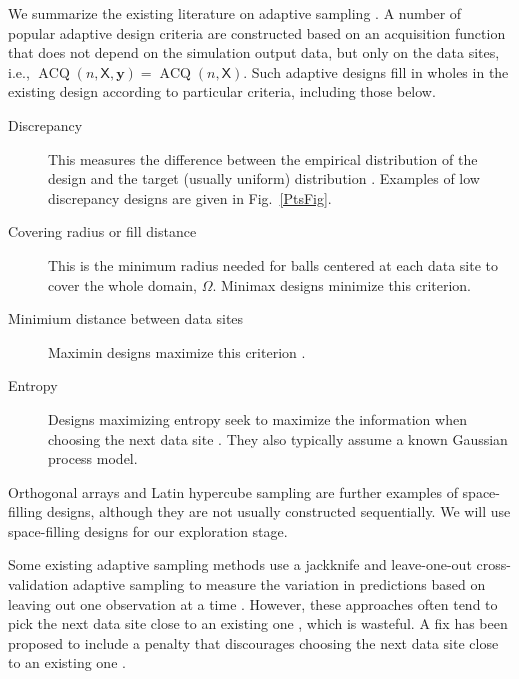 \documentclass[11pt]{NSFamsart}
\DeclareMathOperator{\VAL}{ACQ}
\newcommand{\mX}{\mathsf{X}}
\newcommand{\by}{{\boldsymbol{y}}}
\begin{document}
We summarize the existing literature on adaptive sampling \cite{aute2013cross,burnaev2015adaptive,fu2017adaptive,gramacy2008adaptive,jin2002sequential,kleijnen2004application}. A number of popular adaptive design criteria are constructed based on an acquisition function that does not depend on the simulation output data, but only on the data sites, i.e., $\VAL(n,\mX,\by) = \VAL(n,\mX)$. Such adaptive designs fill in wholes in the existing design according to particular criteria, including those below. 
\begin{description}
\item[Discrepancy] This measures the difference between the empirical distribution of the design and the target (usually uniform) distribution \cite{FangEtal19a}. Examples of low discrepancy designs are given in Fig.\ \ref{PtsFig}. 
\item[Covering radius or fill distance] This is the minimum radius needed for balls centered at each data site to cover the whole domain, $\Omega$. Minimax designs minimize this criterion.
\item[Minimium distance between data sites] Maximin designs maximize this criterion \cite{jin2002sequential}.
\item[Entropy] Designs maximizing entropy seek to maximize the information when choosing the next data site \cite{jin2002sequential}. They also typically assume a known Gaussian process model.
\end{description}
Orthogonal arrays and Latin hypercube sampling are further examples of space-filling designs, although they are not usually constructed sequentially. We will use space-filling designs for our exploration stage. 

Some existing adaptive sampling methods use a jackknife and leave-one-out cross-validation adaptive sampling to measure the variation in predictions based on leaving out one observation at a time \cite{aute2013cross,jin2002sequential, kleijnen2004application}. However, these approaches often tend to pick the next data site close to an existing one \cite{jin2002sequential}, which is wasteful. A fix has been proposed to include a penalty that discourages choosing the next data site close to an existing one \cite{aute2013cross,jin2002sequential}.

\end{document}
